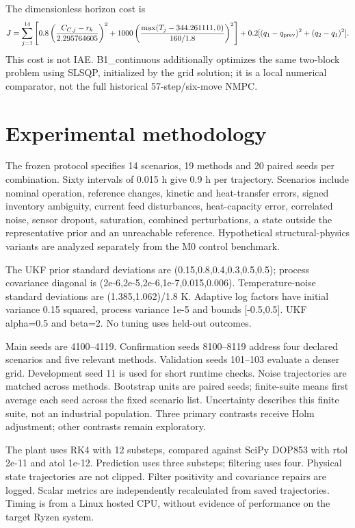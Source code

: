 \documentclass[
  11pt,
]{article}
\begin{document}
The dimensionless horizon cost is
\[J=\sum_{j=1}^{14}\left[0.8\left(\frac{C_{C,j}-r_k}{2.295764605}\right)^2+
1000\left(\frac{\max(T_j-344.261111,0)}{160/1.8}\right)^2\right]
+0.2[(q_1-q_{\rm prev})^2+(q_2-q_1)^2].\] This cost is not IAE.
B1\_continuous additionally optimizes the same two-block problem using
SLSQP, initialized by the grid solution; it is a local numerical
comparator, not the full historical 57-step/six-move NMPC.

\hypertarget{experimental-methodology}{%
\section{Experimental methodology}\label{experimental-methodology}}

The frozen protocol specifies 14 scenarios, 19 methods and 20 paired
seeds per combination. Sixty intervals of 0.015 h give 0.9 h per
trajectory. Scenarios include nominal operation, reference changes,
kinetic and heat-transfer errors, signed inventory ambiguity, current
feed disturbances, heat-capacity error, correlated noise, sensor
dropout, saturation, combined perturbations, a state outside the
representative prior and an unreachable reference. Hypothetical
structural-physics variants are analyzed separately from the M0 control
benchmark.

The UKF prior standard deviations are (0.15,0.8,0.4,0.3,0.5,0.5);
process covariance diagonal is (2e-6,2e-5,2e-6,1e-7,0.015,0.006).
Temperature-noise standard deviations are (1.385,1.062)/1.8 K. Adaptive
log factors have initial variance 0.15 squared, process variance 1e-5
and bounds {[}-0.5,0.5{]}. UKF alpha=0.5 and beta=2. No tuning uses
held-out outcomes.

Main seeds are 4100--4119. Confirmation seeds 8100--8119 address four
declared scenarios and five relevant methods. Validation seeds 101--103
evaluate a denser grid. Development seed 11 is used for short runtime
checks. Noise trajectories are matched across methods. Bootstrap units
are paired seeds; finite-suite means first average each seed across the
fixed scenario list. Uncertainty describes this finite suite, not an
industrial population. Three primary contrasts receive Holm adjustment;
other contrasts remain exploratory.

The plant uses RK4 with 12 substeps, compared against SciPy DOP853 with
rtol 2e-11 and atol 1e-12. Prediction uses three substeps; filtering
uses four. Physical state trajectories are not clipped. Filter
positivity and covariance repairs are logged. Scalar metrics are
independently recalculated from saved trajectories. Timing is from a
Linux hosted CPU, without evidence of performance on the target Ryzen
system.
\end{document}
